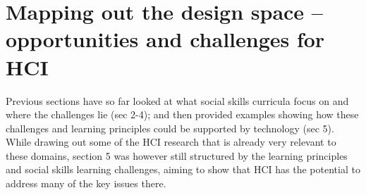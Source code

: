 \documentclass[prodmode,acmtochi]{acmsmall}
\newcommand{\todo}[1]{\textrm{\textrm{\textcolor{LightBlue}{[[#1]]}}}}
\newcommand{\rephrase}[1]{\textrm{\textrm{\textcolor{gray}{#1}}}}
\begin{document}
        
 






\section{Mapping out the design space -- opportunities and challenges for HCI}
\label{sec:agenda}
  

Previous sections have so far looked at what social skills curricula focus on and where the challenges lie (sec 2-4);  and then provided examples showing how these challenges and learning principles could be supported by technology (sec 5).  While drawing out some of the HCI research that is already very relevant to these domains, section 5 was however still structured by the learning principles and social skills learning challenges, aiming to show that HCI has the potential to address many of the key issues there. 
\end{document}
